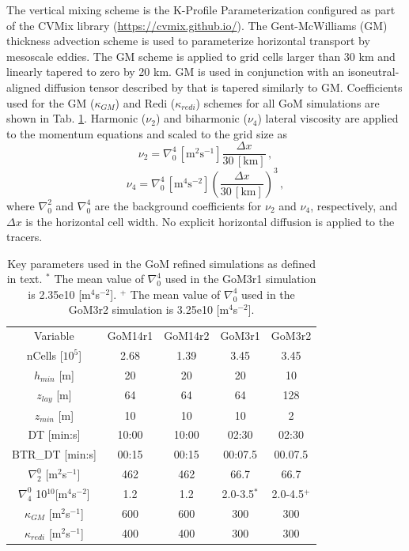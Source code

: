 The vertical mixing scheme is the K-Profile Parameterization \citep[KPP, ][]{large1994oceanic, van2018kpp} configured as part of the CVMix library (\url{https://cvmix.github.io/}). The Gent-McWilliams (GM) thickness advection scheme \citep{gent1990isopycnal} is used to parameterize horizontal transport by mesoscale eddies. The GM scheme is applied to grid cells larger than 30 km and linearly tapered to zero by 20 km. GM is used in conjunction with an isoneutral-aligned diffusion tensor described by \cite{redi1982oceanic} that is tapered similarly to GM. Coefficients used for the GM ($\kappa_{GM}$) and Redi ($\kappa_{redi}$) schemes for all GoM simulations are shown in Tab. \ref{tab:mpaso_sims}. Harmonic ($\nu_2$) and biharmonic ($\nu_4$) lateral viscosity are applied to the momentum equations and scaled to the grid size as 
\begin{equation}
    \nu_2 = \nabla_0^4 \, [\textrm{m}^2 \textrm{s}^{-1}] \frac{\Delta x}{30 \, [\textrm{km}]} \, ,
\end{equation}
\begin{equation}
    \nu_4 = \nabla_0^4 \, [\textrm{m}^4 \textrm{s}^{-2}] \left(\frac{\Delta x}{30 \, [\textrm{km}]}\right)^3 \, ,  
\end{equation}
where $\nabla_0^2$ and $\nabla_0^4$ are the background coefficients for $\nu_2$ and $\nu_4$, respectively, and $\Delta x$ is the horizontal cell width. No explicit horizontal diffusion is applied to the tracers. 

\begin{table}[t] 
\caption{Key parameters used in the GoM refined simulations as defined in text. $^*$ The mean value of $\nabla_0^4$ used in the GoM3r1 simulation is 2.35e10 [m$^4$s$^{-2}$]. $^+$ The mean value of $\nabla_0^4$ used in the GoM3r2 simulation is 3.25e10 [m$^4$s$^{-2}$].} \label{tab:mpaso_sims}
\begin{center}
\begin{tabular}{ccccc}
\hline
Variable & GoM14r1 & GoM14r2 & GoM3r1 & GoM3r2 \\
nCells [$10^5$] & 2.68 & 1.39 & 3.45 & 3.45 \\
$h_{min}$ [m] & 20 & 20 & 20 & 10 \\
$z_{lay}$ [m] & 64 & 64 & 64 & 128 \\
$z_{min}$ [m] & 10 & 10 & 10 & 2 \\
DT [min:s] & 10:00 & 10:00 & 02:30 & 02:30 \\
BTR\_DT [min:s] & 00:15 & 00:15 & 00:07.5 & 00.07.5 \\
$\nabla_2^0$ [m$^2$s$^{-1}$] & 462 & 462 & 66.7 & 66.7 \\
$\nabla_4^0$ 10$^{10}$[m$^4$s$^{-2}$] & 1.2 & 1.2 & 2.0-3.5$^*$ & 2.0-4.5$^+$ \\
$\kappa_{GM}$ [m$^2$s$^{-1}$] & 600 & 600 & 300 & 300 \\
$\kappa_{redi}$ [m$^2$s$^{-1}$] & 400 & 400 & 300 & 300 \\
\hline
\end{tabular}
\end{center}
\end{table}

